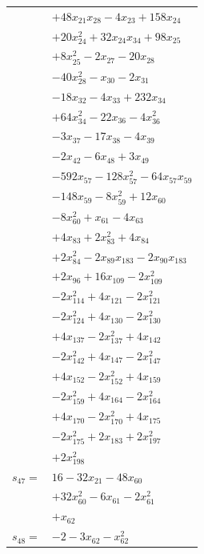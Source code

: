\begin{longtable}{@{}r@{\;}l@{}}
 & \(\displaystyle +48x_{21}x_{28} -4x_{23} +158x_{24}\) \\
 & \(\displaystyle +20x_{24}^{2} +32x_{24}x_{34} +98x_{25}\) \\
 & \(\displaystyle +8x_{25}^{2} -2x_{27} -20x_{28}\) \\
 & \(\displaystyle -40x_{28}^{2} -x_{30} -2x_{31}\) \\
 & \(\displaystyle -18x_{32} -4x_{33} +232x_{34}\) \\
 & \(\displaystyle +64x_{34}^{2} -22x_{36} -4x_{36}^{2}\) \\
 & \(\displaystyle -3x_{37} -17x_{38} -4x_{39}\) \\
 & \(\displaystyle -2x_{42} -6x_{48} +3x_{49}\) \\
 & \(\displaystyle -592x_{57} -128x_{57}^{2} -64x_{57}x_{59}\) \\
 & \(\displaystyle -148x_{59} -8x_{59}^{2} +12x_{60}\) \\
 & \(\displaystyle -8x_{60}^{2} +x_{61} -4x_{63}\) \\
 & \(\displaystyle +4x_{83} +2x_{83}^{2} +4x_{84}\) \\
 & \(\displaystyle +2x_{84}^{2} -2x_{89}x_{183} -2x_{90}x_{183}\) \\
 & \(\displaystyle +2x_{96} +16x_{109} -2x_{109}^{2}\) \\
 & \(\displaystyle -2x_{114}^{2} +4x_{121} -2x_{121}^{2}\) \\
 & \(\displaystyle -2x_{124}^{2} +4x_{130} -2x_{130}^{2}\) \\
 & \(\displaystyle +4x_{137} -2x_{137}^{2} +4x_{142}\) \\
 & \(\displaystyle -2x_{142}^{2} +4x_{147} -2x_{147}^{2}\) \\
 & \(\displaystyle +4x_{152} -2x_{152}^{2} +4x_{159}\) \\
 & \(\displaystyle -2x_{159}^{2} +4x_{164} -2x_{164}^{2}\) \\
 & \(\displaystyle +4x_{170} -2x_{170}^{2} +4x_{175}\) \\
 & \(\displaystyle -2x_{175}^{2} +2x_{183} +2x_{197}^{2}\) \\
 & \(\displaystyle +2x_{198}^{2}\) \\[3pt]
\(s_{47}=\) & \(\displaystyle 16 -32x_{21} -48x_{60}\) \\
 & \(\displaystyle +32x_{60}^{2} -6x_{61} -2x_{61}^{2}\) \\
 & \(\displaystyle +x_{62}\) \\[3pt]
\(s_{48}=\) & \(\displaystyle -2 -3x_{62} -x_{62}^{2}\) \\

\end{longtable}
